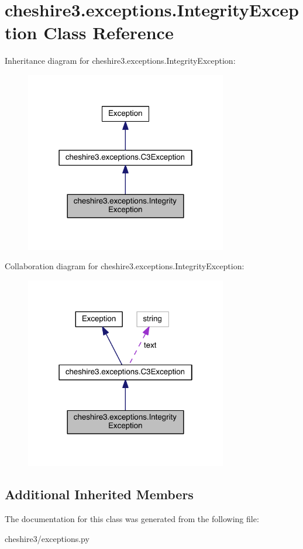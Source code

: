\hypertarget{classcheshire3_1_1exceptions_1_1_integrity_exception}{\section{cheshire3.\-exceptions.\-Integrity\-Exception Class Reference}
\label{classcheshire3_1_1exceptions_1_1_integrity_exception}
}


Inheritance diagram for cheshire3.\-exceptions.\-Integrity\-Exception\-:
\nopagebreak
\begin{figure}[H]
\begin{center}
\leavevmode
\includegraphics[width=250pt]{classcheshire3_1_1exceptions_1_1_integrity_exception__inherit__graph}
\end{center}
\end{figure}


Collaboration diagram for cheshire3.\-exceptions.\-Integrity\-Exception\-:
\nopagebreak
\begin{figure}[H]
\begin{center}
\leavevmode
\includegraphics[width=250pt]{classcheshire3_1_1exceptions_1_1_integrity_exception__coll__graph}
\end{center}
\end{figure}
\subsection*{Additional Inherited Members}


The documentation for this class was generated from the following file\-:\begin{DoxyCompactItemize}
\item 
cheshire3/exceptions.\-py\end{DoxyCompactItemize}

